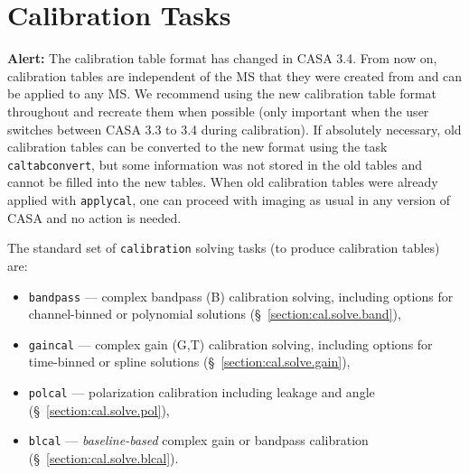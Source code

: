 \section{Calibration Tasks}
\label{section:cal.tasks}

{\bf Alert:} The calibration table format has changed in CASA
3.4. From now on, calibration tables are independent of the MS that
they were created from and can be applied to any MS. We recommend
using the new calibration table format throughout and recreate them
when possible (only important when the user switches between CASA 3.3
to 3.4 during calibration). If absolutely necessary, old calibration
tables can be converted to the new format using the task {\tt
  caltabconvert}, but some information was not stored in the old
tables and cannot be filled into the new tables. When old calibration
tables were already applied with {\tt applycal}, one can proceed with
imaging as usual in any version of CASA and no action is needed.




The standard set of {\tt calibration} solving tasks (to produce
calibration tables) are:
\begin{itemize}
   \item {\tt bandpass} --- complex bandpass (B) calibration solving,
      including options for channel-binned or polynomial solutions
      (\S~\ref{section:cal.solve.band}),
   \item {\tt gaincal} --- complex gain (G,T) calibration solving, 
      including options for time-binned or spline solutions
      (\S~\ref{section:cal.solve.gain}),
   \item {\tt polcal} --- polarization calibration including leakage
      and angle
      (\S~\ref{section:cal.solve.pol}),
   \item {\tt blcal} --- {\it baseline-based} complex gain or bandpass
      calibration
      (\S~\ref{section:cal.solve.blcal}).
\end{itemize}

